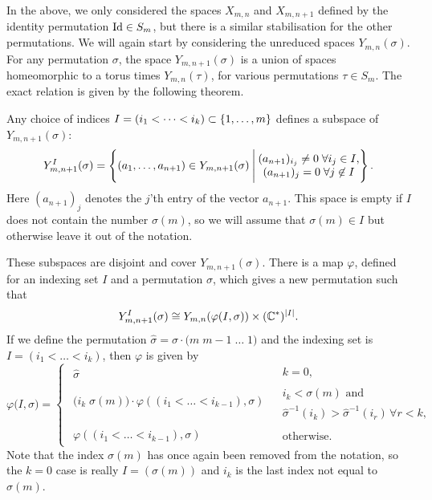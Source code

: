 In the above, we only considered the spaces $X_{m,n}$ and $X_{m,n+1}$
defined by the identity permutation $\operatorname{Id}\in S_m$,
but there is a similar stabilisation for the other permutations. We
will again start by considering the unreduced spaces
$Y_{m,n}(\sigma)$. For
any permutation $\sigma$, the space $Y_{m,n+1}(\sigma)$ is a union of
spaces homeomorphic to a torus times $Y_{m,n}(\tau)$, for various
permutations $\tau\in S_m$. The exact relation is given by the
following theorem.

\begin{theorem}
  \label{thm:permutation}
  Any choice of indices $I= (i_1<\dots<i_k) \subset \left\{ 1,\dots,m \right\}$
  defines a subspace of $Y_{m,n+1}(\sigma)$:
  \[ Y_{m,n+1}^I(\sigma) = \left\{ (a_1,\dots,a_{n+1}) \in
    Y_{m,n+1}(\sigma) \:\Bigg\vert\: 
    \begin{matrix} 
      (a_{n+1})_{i_j} \neq 0\; \forall i_j \in I, \\
      (a_{n+1})_j = 0 \;\forall j \not\in I
    \end{matrix}  \right\}. \]
  Here $(a_{n+1})_j$ denotes the $j$'th entry of the vector $a_{n+1}$.
  This space is empty if $I$ does not contain the number $\sigma(m)$,
  so we will assume that $\sigma(m) \in I$ but otherwise leave it out
  of the notation.
  
  These subspaces are disjoint and cover $Y_{m,n+1}(\sigma)$. There is
  a map $\varphi$,
  defined for an indexing set $I$ and a permutation $\sigma$, which
  gives a new permutation such that
  \[ Y_{m,n+1}^I(\sigma) \cong Y_{m,n}(\varphi(I,\sigma)) \times
  (\mathbb{C}^*)^{\left| I \right|}. \]
  If we define the permutation $\widehat \sigma = \sigma \cdot
  \big(m\; m-1\; \dots \; 1\big)$ and the indexing set is ${I = (i_1 <
    \dots < i_k)}$, then $\varphi$ is given by
  \[ \varphi\big(I,\sigma\big) = 
  \begin{cases}
    \begin{matrix} \widehat\sigma \end{matrix} & 
    \begin{array}{l} k = 0, \end{array} \\
    \begin{matrix}
      \big( i_k\; \sigma(m) \big) \cdot \varphi\left( (i_1 < \dots <
        i_{k-1}),\sigma\right) \\
    \end{matrix} &
    \begin{array}{l} i_k < \sigma(m) \text{ and } \\
      \widehat\sigma^{-1}(i_k) > \widehat\sigma^{-1}(i_r) \,
      \forall r < k,\end{array}\\
    \begin{matrix}
      \varphi\left( (i_1 < \dots < i_{k-1}),\sigma\right)
    \end{matrix} &
    \begin{array}{l} \text{otherwise}. \end{array}
  \end{cases} \]
  Note that the index $\sigma(m)$ has once again been removed from the
  notation, 
  so the $k = 0$ case is really $I = (\sigma(m))$ and $i_k$
  is the last index not equal to $\sigma(m)$.
\end{theorem}
